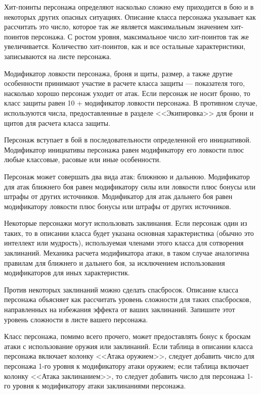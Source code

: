 Хит-поинты персонажа определяют насколько сложно ему приходится в бою и в некоторых других опасных ситуациях. Описание класса персонажа указывает как рассчитать это число, которое так же является максимальным значением хит-поинтов персонажа. С ростом уровня, максимальное число хит-поинтов так же увеличивается. Количество хит-поинтов, как и все остальные характеристики, записываются на листе персонажа.

Модификатор ловкости персонажа, броня и щиты, размер, а также другие особенности принимают участие в расчете класса защиты --- показателя того, насколько хорошо персонаж уходит от атак. Если персонаж не носит броню, то класс защиты равен 10 + модификатор ловкости персонажа. В противном случае, используются числа, предоставленные в разделе <<Экипировка>> для брони и щитов для расчета класса защиты.

Персонаж вступает в бой в последовательности определенной его инициативой. Модификатор инициативы персонажа равен модификатору его ловкости плюс любые классовые, расовые или иные особенности.

Персонаж может совершать два вида атак: ближнюю и дальнюю. Модификатор для атак ближнего боя равен модификатору силы или ловкости плюс бонусы или штрафы от других источников. Модификатор для атак дальнего боя равен модификатору ловкости плюс бонусы или штрафы от других источников.

Некоторые персонажи могут использовать заклинания. Если персонаж один из таких, то в описании класса будет указана основная характеристика (обычно это интеллект или мудрость), используемая членами этого класса для сотворения заклинаний. Механика расчета модификатора атаки, в таком случае аналогична правилам для ближнего и дальнего боя, за исключением использования модификаторов для иных характеристик.

Против некоторых заклинаний можно сделать спасбросок. Описание класса персонажа объясняет как рассчитать уровень сложности для таких спасбросков, направленных на избежания эффекта от ваших заклинаний. Запишите этот уровень сложности в листе вашего персонажа.

Класс персонажа, помимо всего прочего, может предоставлять бонус к броскам атаки с использование оружия или заклинаний. Если таблица в описании класса персонажа включает колонку <<Атака оружием>>, следует добавить число для персонажа 1-го уровня к модификатору атаки оружием; если таблица включает колонку <<Атака заклинанием>>, то следует добавить число для персонажа 1-го уровня к модификатору атаки заклинаниями персонажа.

